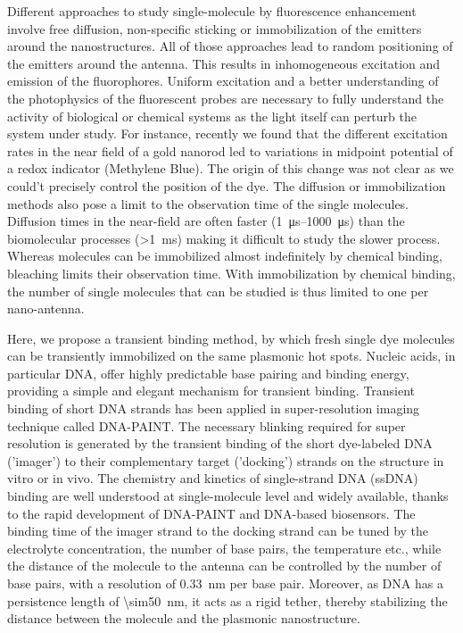 Different approaches to study single-molecule by fluorescence enhancement involve free diffusion, non-specific sticking or immobilization of the emitters around the nanostructures. All of those approaches lead to random positioning of the emitters around the antenna.\cite{pradhan2016goldnanorodenhanced,yuan2013thousandfold,zhang2017gold}
This results in inhomogeneous excitation and emission of the fluorophores.
Uniform excitation and a better understanding of the photophysics of the fluorescent probes are necessary to fully understand the activity of biological or chemical systems as the light itself can perturb the system under study.
For instance, recently we found that the different excitation rates in the near field of a gold nanorod led to variations in midpoint potential of a redox indicator (Methylene Blue). The origin of this change was not clear as we could't precisely control the position of the dye.\cite{zhang2017gold}
The diffusion or immobilization methods also pose a limit to the observation time of the single molecules.
Diffusion times in the near-field are often faster (\SIrange{1}{1000}{\us}) than the biomolecular processes (\SI{>1}{\ms}) making it difficult to study the slower process.
Whereas molecules can be immobilized almost indefinitely by chemical binding, bleaching limits their observation time. With immobilization by chemical binding, the number of single molecules that can be studied is thus limited to one per nano-antenna.

Here, we propose a transient binding method, by which fresh single dye molecules can be transiently immobilized on the same plasmonic hot spots. Nucleic acids, in particular DNA, offer highly predictable base pairing and binding energy, providing a simple and elegant mechanism for transient binding. Transient binding of short DNA strands has been applied in super-resolution imaging technique called DNA-PAINT.\cite{jungmann2010singlemolecule,lin2012submicrometre,schnitzbauer2017superresolution}
The necessary blinking required for super resolution is generated by the transient binding of the short dye-labeled DNA ('imager') to their complementary target ('docking') strands on the structure in vitro or in vivo.
The chemistry and kinetics of single-strand DNA (ssDNA) binding are well understood at single-molecule level and widely available, thanks to the rapid development of DNA-PAINT and DNA-based biosensors.\cite{sassolas2008dna,jungmann2010singlemolecule}
The binding time of the imager strand to the docking strand can be tuned by the electrolyte concentration, the number of base pairs, the temperature etc., while the distance of the molecule to the antenna can be controlled by the number of base pairs, with a resolution of \SI{0.33}{\nm} per base pair.
Moreover, as DNA has a persistence length of \SI{\sim50}{\nm}, it acts as a rigid tether, thereby stabilizing the distance between the molecule and the plasmonic nanostructure.\cite{manning2006the}

